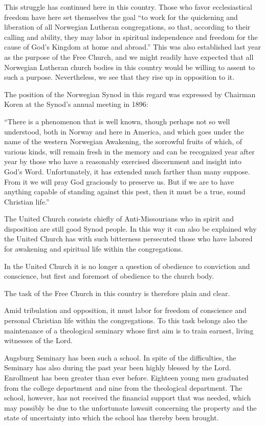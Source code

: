 This struggle has continued here in this country. Those who favor ecclesiastical freedom have here set themselves the goal “to work for the quickening and liberation of all Norwegian Lutheran congregations, so that, according to their calling and ability, they may labor in spiritual independence and freedom for the cause of God’s Kingdom at home and abroad.” This was also established last year as the purpose of the Free Church, and we might readily have expected that all Norwegian Lutheran church bodies in this country would be willing to assent to such a purpose. Nevertheless, we see that they rise up in opposition to it.

The position of the Norwegian Synod in this regard was expressed by Chairman Koren at the Synod’s annual meeting in 1896:

“There is a phenomenon that is well known, though perhaps not so well understood, both in Norway and here in America, and which goes under the name of the western Norwegian Awakening, the sorrowful fruits of which, of various kinds, will remain fresh in the memory and can be recognized year after year by those who have a reasonably exercised discernment and insight into God’s Word. Unfortunately, it has extended much farther than many suppose. From it we will pray God graciously to preserve us. But if we are to have anything capable of standing against this pest, then it must be a true, sound Christian life.”

The United Church consists chiefly of Anti-Missourians who in spirit and disposition are still good Synod people. In this way it can also be explained why the United Church has with such bitterness persecuted those who have labored for awakening and spiritual life within the congregations.

In the United Church it is no longer a question of obedience to conviction and conscience, but first and foremost of obedience to the church body.

The task of the Free Church in this country is therefore plain and clear.

Amid tribulation and opposition, it must labor for freedom of conscience and personal Christian life within the congregations. To this task belongs also the maintenance of a theological seminary whose first aim is to train earnest, living witnesses of the Lord.

Augsburg Seminary has been such a school. In spite of the difficulties, the Seminary has also during the past year been highly blessed by the Lord. Enrollment has been greater than ever before. Eighteen young men graduated from the college department and nine from the theological department. The school, however, has not received the financial support that was needed, which may possibly be due to the unfortunate lawsuit concerning the property and the state of uncertainty into which the school has thereby been brought.


